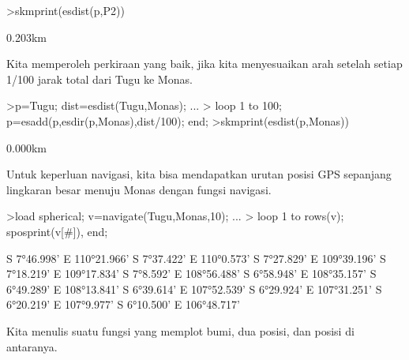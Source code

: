 \documentclass[a4paper,10pt]{article}
\begin{document}
\begin{eulernotebook}
\begin{eulercomment}
\begin{eulercomment}
\begin{eulercomment}
\begin{eulercomment}
\begin{eulercomment}
\begin{eulercomment}
\begin{eulercomment}
\begin{eulercomment}
\begin{eulercomment}
\begin{eulercomment}
\begin{eulercomment}
\begin{eulercomment}
\begin{eulercomment}
\begin{eulercomment}
\begin{eulercomment}
\begin{eulercomment}
\begin{eulercomment}
\begin{eulercomment}
\begin{eulercomment}
\begin{eulercomment}
\begin{eulercomment}
\begin{eulercomment}
\begin{eulercomment}
\begin{eulercomment}
\begin{eulercomment}
\begin{eulercomment}
\begin{eulercomment}
\begin{eulercomment}
\begin{eulercomment}
\begin{eulercomment}
\begin{eulercomment}
\begin{eulercomment}
\begin{eulercomment}
\begin{eulercomment}
\begin{eulerprompt}
>skmprint(esdist(p,P2))
\end{eulerprompt}
\begin{euleroutput}
       0.203km
\end{euleroutput}
\begin{eulercomment}
Kita memperoleh perkiraan yang baik, jika kita menyesuaikan arah
setelah setiap 1/100 jarak total dari Tugu ke Monas.
\end{eulercomment}
\begin{eulerprompt}
>p=Tugu; dist=esdist(Tugu,Monas); ...
>  loop 1 to 100; p=esadd(p,esdir(p,Monas),dist/100); end;
>skmprint(esdist(p,Monas))
\end{eulerprompt}
\begin{euleroutput}
       0.000km
\end{euleroutput}
\begin{eulercomment}
Untuk keperluan navigasi, kita bisa mendapatkan urutan posisi GPS
sepanjang lingkaran besar menuju Monas dengan fungsi navigasi.
\end{eulercomment}
\begin{eulerprompt}
>load spherical; v=navigate(Tugu,Monas,10); ...
>  loop 1 to rows(v); sposprint(v[#]), end;
\end{eulerprompt}
\begin{euleroutput}
  S 7°46.998' E 110°21.966'
  S 7°37.422' E 110°0.573'
  S 7°27.829' E 109°39.196'
  S 7°18.219' E 109°17.834'
  S 7°8.592' E 108°56.488'
  S 6°58.948' E 108°35.157'
  S 6°49.289' E 108°13.841'
  S 6°39.614' E 107°52.539'
  S 6°29.924' E 107°31.251'
  S 6°20.219' E 107°9.977'
  S 6°10.500' E 106°48.717'
\end{euleroutput}
\begin{eulercomment}
Kita menulis suatu fungsi yang memplot bumi, dua posisi, dan posisi di
antaranya.
\end{eulercomment}

\end{eulercomment}
\end{eulercomment}
\end{eulercomment}
\end{eulercomment}
\end{eulercomment}
\end{eulercomment}
\end{eulercomment}
\end{eulercomment}
\end{eulercomment}
\end{eulercomment}
\end{eulercomment}
\end{eulercomment}
\end{eulercomment}
\end{eulercomment}
\end{eulercomment}
\end{eulercomment}
\end{eulercomment}
\end{eulercomment}
\end{eulercomment}
\end{eulercomment}
\end{eulercomment}
\end{eulercomment}
\end{eulercomment}
\end{eulercomment}
\end{eulercomment}
\end{eulercomment}
\end{eulercomment}
\end{eulercomment}
\end{eulercomment}
\end{eulercomment}
\end{eulercomment}
\end{eulercomment}
\end{eulercomment}
\end{eulercomment}
\end{eulernotebook}
\end{document}
